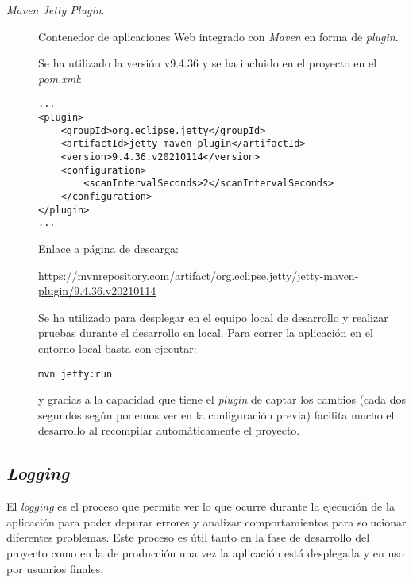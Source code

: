 \begin{description}
	\item[\textit{Maven Jetty Plugin}.] Contenedor de aplicaciones Web integrado con \textit{Maven} en forma de \textit{plugin}.
	
		Se ha utilizado la versión  v9.4.36 y se ha incluido en el proyecto en el \textit{pom.xml}:
	
\begin{verbatim}
...
<plugin>
	<groupId>org.eclipse.jetty</groupId>
	<artifactId>jetty-maven-plugin</artifactId>
	<version>9.4.36.v20210114</version>
	<configuration>
		<scanIntervalSeconds>2</scanIntervalSeconds>
	</configuration>
</plugin>
...
\end{verbatim}
		
Enlace a página de descarga:
		
		\url{https://mvnrepository.com/artifact/org.eclipse.jetty/jetty-maven-plugin/9.4.36.v20210114}
		
Se ha utilizado para desplegar en el equipo local de desarrollo y realizar pruebas durante el desarrollo en local. Para correr la aplicación en el entorno local basta con ejecutar: 
		
\begin{verbatim}
mvn jetty:run
\end{verbatim}

y gracias a la capacidad que tiene el \textit{plugin} de captar los cambios (cada dos segundos según podemos ver en la configuración previa) facilita mucho el desarrollo al recompilar automáticamente el proyecto.
		
\end{description}
\subsection{\textit{Logging}}
El \textit{logging} es el proceso que permite ver lo que ocurre durante la ejecución de la aplicación para poder depurar errores y analizar comportamientos para solucionar diferentes problemas. Este proceso es útil tanto en la fase de desarrollo del proyecto como en la de producción una vez la aplicación está desplegada y en uso por usuarios finales.

